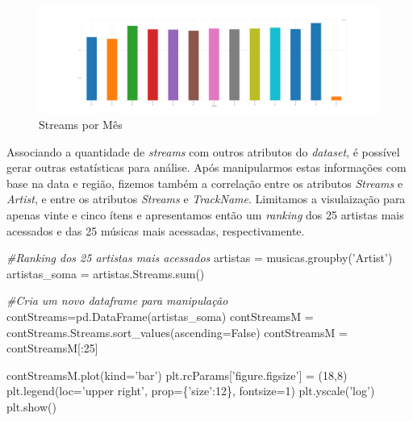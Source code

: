 \documentclass[11pt]{article}
\makeatletter
\def\maxwidth{\ifdim\Gin@nat@width>\linewidth\linewidth
    \else\Gin@nat@width\fi}
\let\Oldincludegraphics\includegraphics
\renewcommand{\includegraphics}[1]{\Oldincludegraphics[width=.8\maxwidth]{#1}}
\newenvironment{Shaded}{}{}
\newcommand{\DecValTok}[1]{\textcolor[rgb]{0.25,0.63,0.44}{{#1}}}
\newcommand{\StringTok}[1]{\textcolor[rgb]{0.25,0.44,0.63}{{#1}}}
\newcommand{\CommentTok}[1]{\textcolor[rgb]{0.38,0.63,0.69}{\textit{{#1}}}}
\newcommand{\NormalTok}[1]{{#1}}
\newcommand{\VariableTok}[1]{\textcolor[rgb]{0.10,0.09,0.49}{{#1}}}
\newcommand{\OperatorTok}[1]{\textcolor[rgb]{0.40,0.40,0.40}{{#1}}}
\newcommand{\BuiltInTok}[1]{{#1}}
\makeatother
\begin{document}
\begin{figure}
\centering
\includegraphics{mesesMaisStreams.png}
\caption{Streams por Mês}
\end{figure}

    Associando a quantidade de \emph{streams} com outros atributos do
\emph{dataset}, é possível gerar outras estatísticas para análise. Após
manipularmos estas informações com base na data e região, fizemos também
a correlação entre os atributos \emph{Streams} e \emph{Artist}, e entre
os atributos \emph{Streams} e \emph{TrackName}. Limitamos a visulaização
para apenas vinte e cinco ítens e apresentamos então um \emph{ranking}
dos 25 artistas mais acessados e das 25 músicas mais acessadas,
respectivamente.

\begin{Shaded}
\begin{Highlighting}[]
\CommentTok{#Ranking dos 25 artistas mais acessados}
\NormalTok{artistas }\OperatorTok{=}\NormalTok{ musicas.groupby(}\StringTok{'Artist'}\NormalTok{)}
\NormalTok{artistas_soma }\OperatorTok{=}\NormalTok{ artistas.Streams.}\BuiltInTok{sum}\NormalTok{()}

\CommentTok{#Cria um novo dataframe para manipulação}
\NormalTok{contStreams}\OperatorTok{=}\NormalTok{pd.DataFrame(artistas_soma)}
\NormalTok{contStreamsM }\OperatorTok{=}\NormalTok{ contStreams.Streams.sort_values(ascending}\OperatorTok{=}\VariableTok{False}\NormalTok{)}
\NormalTok{contStreamsM }\OperatorTok{=}\NormalTok{ contStreamsM[:}\DecValTok{25}\NormalTok{]}

\NormalTok{contStreamsM.plot(kind}\OperatorTok{=}\StringTok{'bar'}\NormalTok{)}
\NormalTok{plt.rcParams[}\StringTok{'figure.figsize'}\NormalTok{] }\OperatorTok{=}\NormalTok{ (}\DecValTok{18}\NormalTok{,}\DecValTok{8}\NormalTok{)}
\NormalTok{plt.legend(loc}\OperatorTok{=}\StringTok{'upper right'}\NormalTok{, prop}\OperatorTok{=}\NormalTok{\{}\StringTok{'size'}\NormalTok{:}\DecValTok{12}\NormalTok{\}, fontsize}\OperatorTok{=}\DecValTok{1}\NormalTok{)}
\NormalTok{plt.yscale(}\StringTok{'log'}\NormalTok{)}
\NormalTok{plt.show()}
\end{Highlighting}
\end{Shaded}
\end{document}
